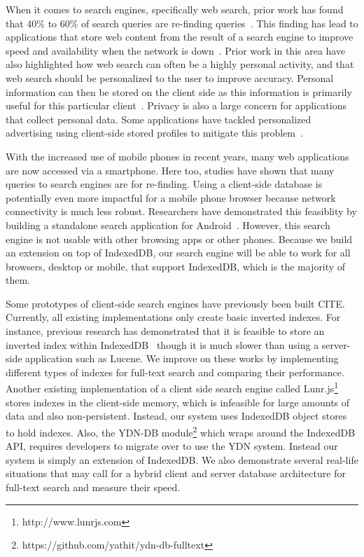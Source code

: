 \documentclass{vldb}
\begin{document}
When it comes to search engines, specifically web search, prior work has found that 40\% to 60\% of search queries are re-finding queries~\cite{teevan2005personalizing}. This finding has lead to applications that store web content from the result of a search engine to improve speed and availability when the network is down~\cite{bozzon2010liquid,bharat2000searchpad,balasubramanian2012findall}. Prior work in this area have also highlighted how web search can often be a highly personal activity, and that web search should be personalized to the user to improve accuracy. Personal information can then be stored on the client side as this information is primarily useful for this particular client~\cite{teevan2005personalizing}.
Privacy is also a large concern for applications that collect personal data. Some applications have tackled personalized advertising using client-side stored profiles to mitigate this problem~\cite{bilenko2011predictive}.

With the increased use of mobile phones in recent years, many web applications are now accessed via a smartphone. Here too, studies have shown that many queries to search engines are for re-finding. Using a client-side database is potentially even more impactful for a mobile phone browser because network connectivity is much less robust. Researchers have demonstrated this feasiblity by building a standalone search application for Android~\cite{balasubramanian2012findall}. However, this search engine is not usable with other browsing apps or other phones. Because we build an extension on top of IndexedDB, our search engine will be able to work for all browsers, desktop or mobile, that support IndexedDB, which is the majority of them.

Some prototypes of client-side search engines have previously been built CITE. Currently, all existing implementations only create basic inverted indexes.
For instance, previous research has demonstrated that it is feasible to store an inverted index within IndexedDB~\cite{lin:jscene} though it is much slower than using a server-side application such as Lucene.
We improve on these works by implementing different types of indexes for full-text search and comparing their performance. 
Another existing implementation of a client side search engine called Lunr.js\footnote{http://www.lunrjs.com} stores indexes in the client-side memory, which is infeasible for large amounts of data and also non-persistent. Instead, our system uses IndexedDB object stores to hold indexes. Also, the YDN-DB module\footnote{https://github.com/yathit/ydn-db-fulltext} which wraps around the IndexedDB API, requires developers to migrate over to use the YDN system. Instead our system is simply an extension of IndexedDB.
We also demonstrate several real-life situations that may call for a hybrid client and server database architecture for full-text search and measure their speed.
\end{document}
